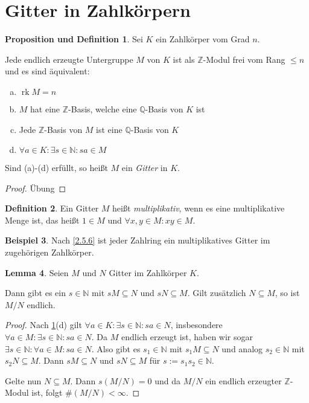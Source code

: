 \documentclass[
twoside=semi,
fontsize=12,
DIV=12, 
cleardoublepage=current,
leqno,
headings=optiontoheadandtoc, 
toc=idx
]{scrbook}
\newcommand{\N}{\mathbb{N}}
\newcommand{\Z}{\mathbb{Z}}
\newcommand{\Q}{\mathbb{Q}}
\DeclareMathOperator{\rk}{rk}
\theoremstyle{definition}
\newtheorem{definition}{Definition}[section]
\newtheorem{beispiel}[definition]{Beispiel}
\newtheorem{lemma}[definition]{Lemma}
\newtheorem{prop-def}[definition]{Proposition und Definition}
\begin{document}
 	\section{Gitter in Zahlk\"orpern}
 	\begin{prop-def}\label{3.1.1}\hfill\newline
 		Sei $K$ ein Zahlk\"orper vom Grad $n$. 
 		
 		\medskip\noindent
 		Jede endlich erzeugte Untergruppe $M$ von $K$ ist als $\Z$-Modul frei vom Rang $\leq n$ und es sind \"aquivalent:
 		\begin{enumerate}[(a)]
 			\item $\rk M = n$
 			\item $M$ hat eine $\Z$-Basis, welche eine $\Q$-Basis von $K$ ist
 			\item Jede $\Z$-Basis von $M$ ist eine $\Q$-Basis von $K$  
 			\item $\forall a \in K: \exists s \in \N: sa \in M$
 		\end{enumerate}
 		
 		\noindent
 		Sind (a)-(d) erf\"ullt, so hei\ss t $M$ ein \emph{Gitter} in $K$.
 		\begin{proof}
 			\"Ubung
 		\end{proof}
 	\end{prop-def}
 
 	\begin{definition}\label{3.1.2}\hfill\newline
 		Ein Gitter $M$ hei\ss t \emph{multiplikativ}, wenn es eine multiplikative Menge ist, das hei\ss t $1 \in M$ und $\forall x,y \in M: xy \in M$.
 	\end{definition}
 
 	\begin{beispiel}\label{3.1.3}\hfill\newline
 		Nach \ref{2.5.6} ist jeder Zahlring ein multiplikatives Gitter im zugeh\"origen Zahlk\"orper.
 	\end{beispiel}
 
 	\begin{lemma}\label{3.1.4}\hfill\newline
 		Seien $M$ und $N$ Gitter im Zahlk\"orper $K$. 
 		
 		\medskip\noindent
 		Dann gibt es ein $s \in \N$ mit $sM \subseteq N$ und $sN \subseteq M$. Gilt zus\"atzlich $N \subseteq M$, so ist $M/N$ endlich.
 		
 		\begin{proof}
 			Nach \ref{3.1.1}(d) gilt $\forall a \in K: \exists s \in \N: sa \in N$, insbesondere \linebreak $\forall a \in M: \exists s \in \N: sa \in N$. Da $M$ endlich erzeugt ist, haben wir sogar \linebreak
 			$\exists s \in \N: \forall a \in M: sa \in N$. Also gibt es $s_1 \in \N$ mit $s_1M \subseteq N$ und analog $s_2 \in \N$ mit $s_2N \subseteq M$. Dann $sM \subseteq N$ und $sN \subseteq M$ f\"ur $s:= s_1s_2 \in \N$.
 			
 			Gelte nun $N \subseteq M$. Dann $s(M/N) = 0$ und da $M/N$ ein endlich erzeugter $\Z$-Modul ist, folgt $\#(M/N) < \infty$.
 		\end{proof}
 	\end{lemma}
 
\end{document}
